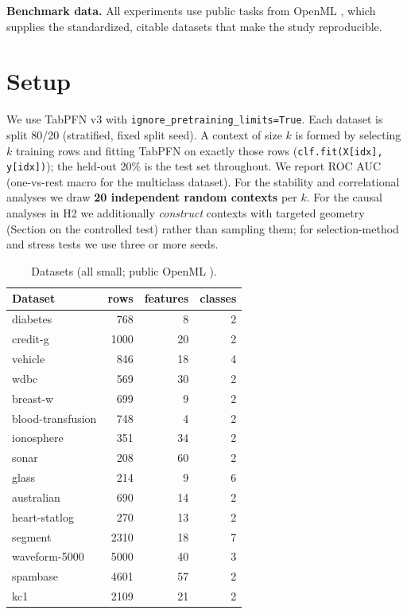 \documentclass[11pt,a4paper]{article}
\begin{document}
\textbf{Benchmark data.} All experiments use public tasks from OpenML
\cite{vanschoren2014openml}, which supplies the standardized, citable datasets
that make the study reproducible.

\section{Setup}

We use TabPFN v3 with \texttt{ignore\_pretraining\_limits=True}. Each dataset is
split 80/20 (stratified, fixed split seed). A context of size $k$ is formed by
selecting $k$ training rows and fitting TabPFN on exactly those rows
(\texttt{clf.fit(X[idx], y[idx])}); the held-out 20\% is the test set throughout.
We report ROC AUC (one-vs-rest macro for the multiclass dataset). For the
stability and correlational analyses we draw \textbf{20 independent random
contexts} per $k$. For the causal analyses in H2 we additionally \emph{construct}
contexts with targeted geometry (Section on the controlled test) rather than
sampling them; for selection-method and stress tests we use three or more seeds.

\begin{table}[h]
\centering
\caption{Datasets (all small; public OpenML \cite{vanschoren2014openml}).}
\label{tab:datasets}
\begin{tabular}{lrrr}
\toprule
Dataset & rows & features & classes \\
\midrule
diabetes           & 768  & 8  & 2 \\
credit-g           & 1000 & 20 & 2 \\
vehicle            & 846  & 18 & 4 \\
wdbc               & 569  & 30 & 2 \\
breast-w           & 699  & 9  & 2 \\
blood-transfusion  & 748  & 4  & 2 \\
ionosphere         & 351  & 34 & 2 \\
sonar              & 208  & 60 & 2 \\
glass              & 214  & 9  & 6 \\
australian         & 690  & 14 & 2 \\
heart-statlog      & 270  & 13 & 2 \\
segment            & 2310 & 18 & 7 \\
waveform-5000      & 5000 & 40 & 3 \\
spambase           & 4601 & 57 & 2 \\
kc1                & 2109 & 21 & 2 \\
\bottomrule
\end{tabular}
\end{table}
\end{document}
